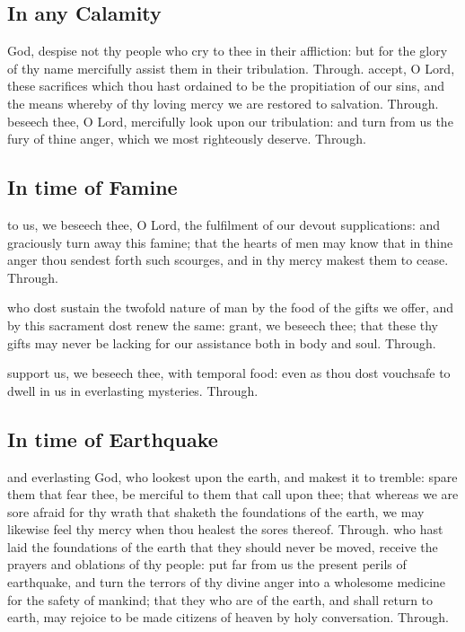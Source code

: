 \begin{multicols}{2}
\subsection{In any Calamity}
\collect
{} God, despise not thy people who cry to thee in their affliction: but for the glory of thy name mercifully assist them in their tribulation. Through.
\secret
{} accept, O Lord, these sacrifices which thou hast ordained to be the propitiation of our sins, and the means whereby of thy loving mercy we are restored to salvation. Through.
\postcommunion
{} beseech thee, O Lord, mercifully look upon our tribulation: and turn from us the fury of thine anger, which we most righteously deserve. Through.

\subsection{In time of Famine}
\collect
{} to us, we beseech thee, O Lord, the fulfilment of our devout supplications: and graciously turn away this famine; that the hearts of men may know that in thine anger thou sendest forth such scourges, and in thy mercy makest them to cease. Through.

\secret
{} who dost sustain the twofold nature of man by the food of the gifts we offer, and by this sacrament dost renew the same: grant, we beseech thee; that these thy gifts may never be lacking for our assistance both in body and soul. Through.

\postcommunion
{} support us, we beseech thee, with temporal food: even as thou dost vouchsafe to dwell in us in everlasting mysteries. Through.

\subsection{In time of Earthquake}
\collect
{} and everlasting God, who lookest upon the earth, and makest it to tremble: spare them that fear thee, be merciful to them that call upon thee; that whereas we are sore afraid for thy wrath that shaketh the foundations of the earth, we may likewise feel thy mercy when thou healest the sores thereof. Through.
\secret
{} who hast laid the foundations of the earth that they should never be moved, receive the prayers and oblations of thy people: put far from us the present perils of earthquake, and turn the terrors of thy divine anger into a wholesome medicine for the safety of mankind; that they who are of the earth, and shall return to earth, may rejoice to be made citizens of heaven by holy conversation. Through.


\end{multicols}
